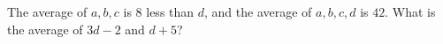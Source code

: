 The average of $a,b,c$ is $8$ less than $d$, and the average of $a,b,c,d$ is $42$. What is the average of $3d-2$ and $d+5$?
